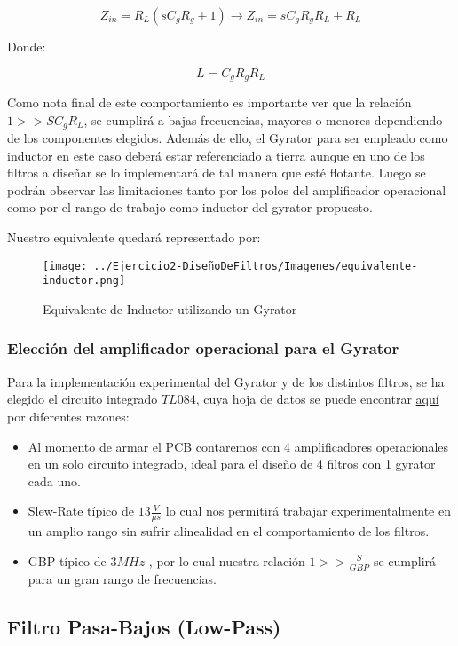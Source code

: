 $$Z_{in}=R_L(sC_gR_g+1)\longrightarrow Z_{in}=sC_gR_gR_L+R_L$$

Donde:

$$L=C_gR_gR_L$$

Como nota final de este comportamiento es importante ver que la relación $1 >> SC_gR_L$, se cumplirá a bajas frecuencias,
mayores o menores dependiendo de los componentes elegidos. Además de ello, el Gyrator para ser empleado como inductor en este caso deberá estar
referenciado a tierra aunque en uno de los filtros a diseñar se lo implementará de tal manera que esté flotante. Luego se podrán observar las limitaciones
tanto por los polos del amplificador operacional como por el rango de trabajo como inductor del gyrator propuesto. 


Nuestro equivalente quedará representado por:

\begin{figure}[H]
    \centering
    \texttt{[image: ../Ejercicio2-DiseñoDeFiltros/Imagenes/equivalente-inductor.png]}
    \caption{Equivalente de Inductor utilizando un Gyrator}
\end{figure}

\subsubsection{Elección del amplificador operacional para el Gyrator}

Para la implementación experimental del Gyrator y de los distintos filtros, 
se ha elegido el circuito integrado $TL084$, cuya hoja de datos se puede encontrar \href{https://www.ti.com/lit/ds/symlink/tl084.pdf?ts=1602260789397&ref_url=https%253A%252F%252Fwww.ti.com%252Fproduct%252FTL084}{aquí} por diferentes razones:

\begin{itemize}
	\item Al momento de armar el PCB contaremos con 4 amplificadores operacionales en un solo circuito integrado, ideal para el diseño de 4 filtros con 1 gyrator cada uno. 
	\item Slew-Rate típico de $13 \frac{V}{\mu s}$ lo cual nos permitirá trabajar experimentalmente en un amplio rango sin sufrir alinealidad en el comportamiento de los filtros.
	\item GBP típico de $3MHz$ , por lo cual nuestra relación $1 >> \frac{S}{GBP}$ se cumplirá para un gran rango de frecuencias.
\end{itemize}

\subsection{Filtro Pasa-Bajos (Low-Pass)}

